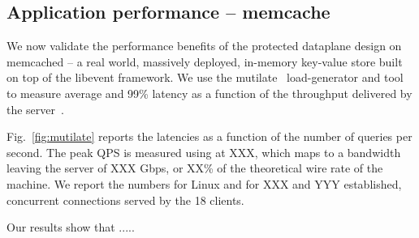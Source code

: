 \subsection{Application performance -- memcache}
\label{sec:eval:memcached}



We now validate the performance benefits of the protected dataplane
design on memcached -- a real world, massively deployed, in-memory
key-value store built on top of the libevent framework.  We use the
mutilate~\cite{url:mutilate} load-generator and tool to measure
average and 99\% latency as a function of the throughput delivered by
the server~\cite{Leverich:RHSU:2014}.

Fig.~\ref{fig:mutilate} reports the latencies as a function of the
number of queries per second.  The peak QPS is measured using \ix at
XXX, which maps to a bandwidth leaving the server of XXX Gbps, or XX\%
of the theoretical wire rate of the machine.  We report the numbers
for Linux and \ix for XXX and YYY established, concurrent
connections served by the 18 clients.

Our results show that .....



%
